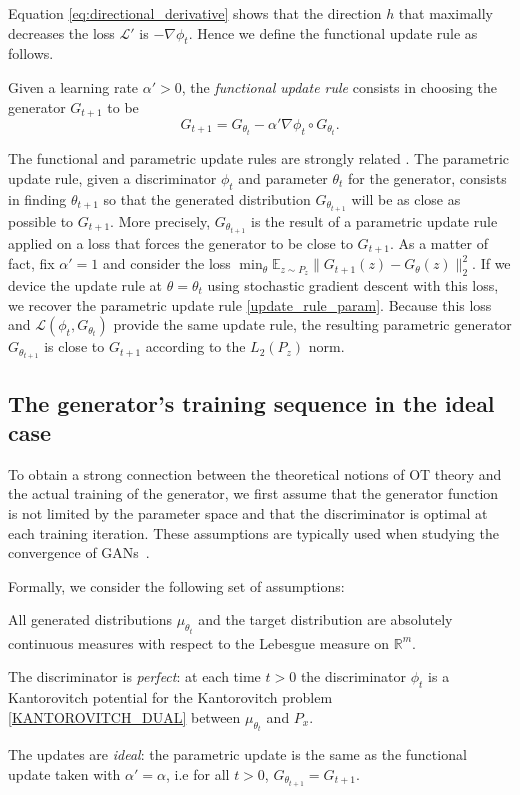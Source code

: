 \documentclass[runningheads]{llncs}
\begin{document}
Equation \eqref{eq:directional_derivative} shows that the direction $h$ that maximally decreases the loss $\mathcal{L'}$ is $-\nabla \phi_t$. Hence we define the functional update rule as follows.
\begin{definition}
\normalfont
\label{derivative_functional_gradien_loss}
 Given a learning rate $\alpha'>0$, the \textit{functional update rule} consists in choosing the generator $G_{t+1}$ to be \[G_{t+1}=G_{\theta_t}-\alpha' \nabla \phi_t \circ G_{\theta_t}.\] 
\end{definition}
The functional and parametric update rules are strongly related \cite{yamaguchi2018distributional}. The parametric update rule, given a discriminator $\phi_t$ and parameter $\theta_t$ for the generator, consists in finding $\theta_{t+1}$ so that the generated distribution $G_{\theta_{t+1}}$ will be as close as possible to $G_{t+1}$. More precisely, $G_{\theta_{t+1}}$ is the result of a parametric update rule applied on a loss that forces the generator to be close to $G_{t+1}$. As a matter of fact, fix $\alpha'=1$ and consider the loss $\min_\theta \mathds{E}_{z\sim P_z}\|G_{t+1}(z)- G_{\theta}(z)\|_2^2$. If we device the update rule at $\theta=\theta_t$ using stochastic gradient descent with this loss, we recover the parametric update rule \eqref{update_rule_param}. Because this loss and $\mathcal{L}(\phi_t,G_{\theta_t})$ provide the same update rule, the resulting parametric generator $G_{\theta_{t+1}}$ is close to $G_{t+1}$ according to the $L_2(P_z)$ norm. 

\subsection{The generator's training sequence in the ideal case}
To obtain a strong connection between the theoretical notions of OT theory and the actual training of the generator, we first assume that the generator function is not limited by the parameter space and that the discriminator is optimal at each training iteration. These assumptions are typically used when studying the convergence of GANs~\cite{kodali2017convergence,mescheder2018training,lin2018pacgan}.

Formally, we consider the following set of assumptions:
\begin{inlinelist}
    \item All generated distributions $\mu_{\theta_t}$ and the target distribution are absolutely continuous measures with respect to the Lebesgue measure on $\mathds{R}^m$.
    \item The discriminator is \textit{perfect}: at each time $t>0$ the discriminator $\phi_t$ is a Kantorovitch potential for the Kantorovitch problem \eqref{KANTOROVITCH_DUAL} between $\mu_{\theta_t}$ and $P_x$.
    \item The updates are \textit{ideal}: the parametric update is the same as the functional update taken with $\alpha'=\alpha$, i.e for all $t>0$, $G_{\theta_{t+1}}=G_{t+1}$.
\end{inlinelist}
\end{document}
